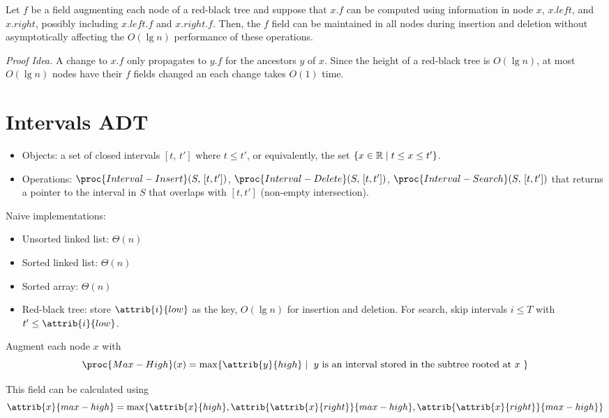 \begin{theorem}
    Let $f$ be a field augmenting each node of a red-black tree and suppose that $x.f$ can be computed using information in node $x$, $x.left$, and $x.right$, possibly including $x.left.f$ and $x.right.f$. Then, the $f$ field can be maintained in all nodes during insertion and deletion without asymptotically affecting the $O(\lg n)$ performance of these operations.  
\end{theorem}

\textit{Proof Idea.} A change to $x.f$ only propagates to $y.f$ for the ancestors $y$ of $x$. Since the height of a red-black tree is $O(\lg n)$, at most $O(\lg n)$ nodes have their $f$ fields changed an each change takes $O(1)$ time.

\section{Intervals ADT}

\begin{itemize}
    \item Objects: a set of closed intervals $[t,\, t']$ where $t \leq t'$, or equivalently, the set $\{ x \in \mathbb{R} \mid t \leq x \leq t' \}$.
    \item Operations: $\proc{Interval-Insert}(S,\, [t,t'])$, $\proc{Interval-Delete}(S,\, [t,t'])$, $\proc{Interval-Search}(S,\, [t,t'])$ that returns a pointer to the interval in $S$ that overlaps with $[t,t']$ (non-empty intersection).
\end{itemize}

Naive implementations:

\begin{itemize}
    \item Unsorted linked list: $\Theta(n)$
    \item Sorted linked list: $\Theta(n)$
    \item Sorted array: $\Theta(n)$
    \item Red-black tree: store $\attrib{i}{low}$ as the key, $O(\lg n)$ for insertion and deletion. For search, skip intervals $i \leq T$ with $t' \leq \attrib{i}{low}$.
\end{itemize}

Augment each node $x$ with 
$$
\proc{Max-High}(x) = \max\{ \attrib{y}{high} \mid \text{ $y$ is an interval stored in the subtree rooted at $x$ } \}
$$

This field can be calculated using
$$
\attrib{x}{max-high} = \max\{ \attrib{x}{high}, \attrib{\attrib{x}{right}}{max-high}, \attrib{\attrib{x}{right}}{max-high} \}
$$

